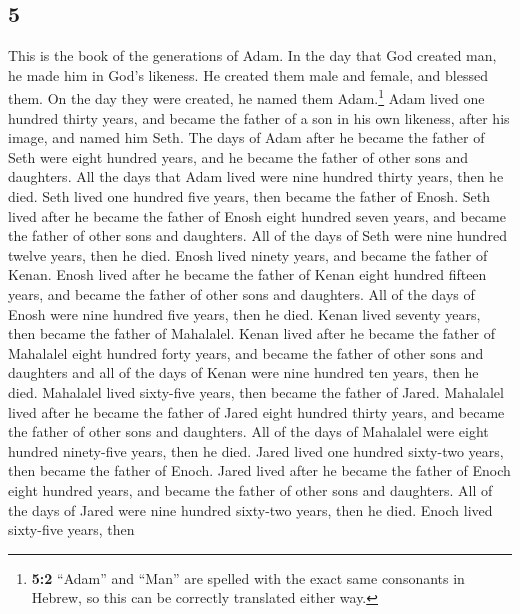 \begin{paracol}{2}
\begin{otherlanguage}{english}
\hypertarget{section-9}{%
\section{5}\label{section-9}}

 This is the book of the generations of Adam. In the day
that God created man, he made him in God's likeness.  He
created them male and female, and blessed them. On the day they were
created, he named them Adam.\footnote{\textbf{5:2} ``Adam'' and ``Man''
  are spelled with the exact same consonants in Hebrew, so this can be
  correctly translated either way.}  Adam lived one
hundred thirty years, and became the father of a son in his own
likeness, after his image, and named him Seth.  The days
of Adam after he became the father of Seth were eight hundred years, and
he became the father of other sons and daughters.  All the
days that Adam lived were nine hundred thirty years, then he died.
 Seth lived one hundred five years, then became the father
of Enosh.  Seth lived after he became the father of Enosh
eight hundred seven years, and became the father of other sons and
daughters.  All of the days of Seth were nine hundred
twelve years, then he died.  Enosh lived ninety years, and
became the father of Kenan.  Enosh lived after he became
the father of Kenan eight hundred fifteen years, and became the father
of other sons and daughters.  All of the days of Enosh
were nine hundred five years, then he died.  Kenan lived
seventy years, then became the father of Mahalalel. 
Kenan lived after he became the father of Mahalalel eight hundred forty
years, and became the father of other sons and daughters 
and all of the days of Kenan were nine hundred ten years, then he died.
 Mahalalel lived sixty-five years, then became the father
of Jared.  Mahalalel lived after he became the father of
Jared eight hundred thirty years, and became the father of other sons
and daughters.  All of the days of Mahalalel were eight
hundred ninety-five years, then he died.  Jared lived one
hundred sixty-two years, then became the father of Enoch.
 Jared lived after he became the father of Enoch eight
hundred years, and became the father of other sons and daughters.
 All of the days of Jared were nine hundred sixty-two
years, then he died.  Enoch lived sixty-five years, then

\end{otherlanguage}
\end{paracol}
